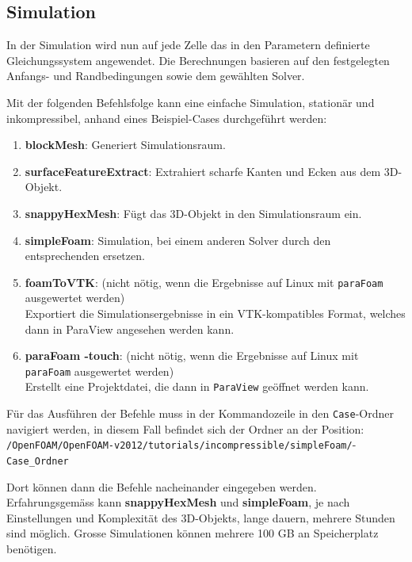 

\subsection{Simulation \label{openfoam:section:Simulation}}
In der Simulation wird nun auf jede Zelle das in den Parametern definierte Gleichungssystem angewendet.
Die Berechnungen basieren auf den festgelegten Anfangs- und Randbedingungen sowie dem gewählten Solver.

Mit der folgenden Befehlsfolge kann eine einfache Simulation, stationär und inkompressibel, anhand eines Beispiel-Cases durchgeführt werden:

\begin{enumerate}
    \item \textbf{blockMesh}: Generiert Simulationsraum.
    \item \textbf{surfaceFeatureExtract}: Extrahiert scharfe Kanten und Ecken aus dem 3D-Objekt.
    \item \textbf{snappyHexMesh}: Fügt das 3D-Objekt in den Simulationsraum ein.
    \item \textbf{simpleFoam}: Simulation, bei einem anderen Solver durch den entsprechenden ersetzen.
    \item \textbf{foamToVTK}: (nicht nötig, wenn die Ergebnisse auf Linux mit \texttt{paraFoam} ausgewertet werden)\\
    Exportiert die Simulationsergebnisse in ein VTK-kompatibles Format, welches dann in ParaView angesehen werden kann.
    \item \textbf{paraFoam -touch}: (nicht nötig, wenn die Ergebnisse auf Linux mit \texttt{paraFoam} ausgewertet werden)\\
    Erstellt eine Projektdatei, die dann in \texttt{ParaView} geöffnet werden kann.
\end{enumerate}

Für das Ausführen der Befehle muss in der Kommandozeile in den \texttt{Case}-Ordner navigiert werden, in diesem Fall befindet sich der Ordner an der Position:\\
\texttt{/OpenFOAM/OpenFOAM-v2012/tutorials/incompressible/simpleFoam/}-\\
\texttt{Case\_Ordner}

Dort können dann die Befehle nacheinander eingegeben werden.
Erfahrungsgemäss kann \textbf{snappyHexMesh} und \textbf{simpleFoam}, je nach Einstellungen und Komplexität des 3D-Objekts, 
lange dauern, mehrere Stunden sind möglich.
Grosse Simulationen können mehrere 100 GB an Speicherplatz benötigen.

